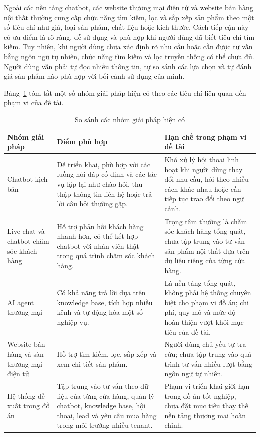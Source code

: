 \documentclass[../DoAn.tex]{subfiles}
\begin{document}
Ngoài các nền tảng chatbot, các website thương mại điện tử và website bán hàng nội thất thường cung cấp chức năng tìm kiếm, lọc và sắp xếp sản phẩm theo một số tiêu chí như giá, loại sản phẩm, chất liệu hoặc kích thước. Cách tiếp cận này có ưu điểm là rõ ràng, dễ sử dụng và phù hợp khi người dùng đã biết tiêu chí tìm kiếm. Tuy nhiên, khi người dùng chưa xác định rõ nhu cầu hoặc cần được tư vấn bằng ngôn ngữ tự nhiên, chức năng tìm kiếm và lọc truyền thống có thể chưa đủ. Người dùng vẫn phải tự đọc nhiều thông tin, tự so sánh các lựa chọn và tự đánh giá sản phẩm nào phù hợp với bối cảnh sử dụng của mình.

Bảng~\ref{table:so-sanh-giai-phap-hien-co} tóm tắt một số nhóm giải pháp hiện có theo các tiêu chí liên quan đến phạm vi của đề tài.

\begin{table}[H]
\centering
\caption{So sánh các nhóm giải pháp hiện có}
\label{table:so-sanh-giai-phap-hien-co}
\begin{tabular}{|p{}|p{}|p{}|}
\hline
\textbf{Nhóm giải pháp} & \textbf{Điểm phù hợp} & \textbf{Hạn chế trong phạm vi đề tài} \\
\hline
Chatbot kịch bản & Dễ triển khai, phù hợp với các luồng hỏi đáp cố định và các tác vụ lặp lại như chào hỏi, thu thập thông tin liên hệ hoặc trả lời câu hỏi thường gặp. & Khó xử lý hội thoại linh hoạt khi người dùng thay đổi nhu cầu, hỏi theo nhiều cách khác nhau hoặc cần tiếp tục trao đổi theo ngữ cảnh. \\
\hline
Live chat và chatbot chăm sóc khách hàng & Hỗ trợ phản hồi khách hàng nhanh hơn, có thể kết hợp chatbot với nhân viên thật trong quá trình chăm sóc khách hàng. & Trọng tâm thường là chăm sóc khách hàng tổng quát, chưa tập trung vào tư vấn sản phẩm nội thất dựa trên dữ liệu riêng của từng cửa hàng. \\
\hline
AI agent thương mại & Có khả năng trả lời dựa trên knowledge base, tích hợp nhiều kênh và tự động hóa một số nghiệp vụ. & Là nền tảng tổng quát, không phải hệ thống chuyên biệt cho phạm vi đồ án; chi phí, quy mô và mức độ hoàn thiện vượt khỏi mục tiêu của đề tài. \\
\hline
Website bán hàng và sàn thương mại điện tử & Hỗ trợ tìm kiếm, lọc, sắp xếp và xem chi tiết sản phẩm. & Người dùng chủ yếu tự tra cứu; chưa tập trung vào quá trình tư vấn nhiều lượt bằng ngôn ngữ tự nhiên. \\
\hline
Hệ thống đề xuất trong đồ án & Tập trung vào tư vấn theo dữ liệu của từng cửa hàng, quản lý chatbot, knowledge base, hội thoại, lead và yêu cầu mua hàng trong môi trường nhiều tenant. & Phạm vi triển khai giới hạn trong đồ án tốt nghiệp, chưa đặt mục tiêu thay thế nền tảng thương mại hoàn chỉnh. \\
\hline
\end{tabular}
\end{table}
\end{document}
